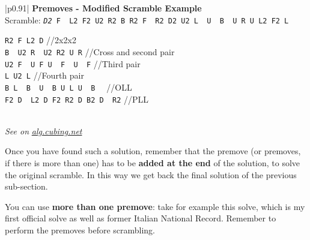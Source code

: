 \documentclass[11pt,a4paper]{book}
\newcommand{\p}{\textquotesingle}
\newcommand{\m}{\texttt}
\newcommand{\ps}{\p\,\,}
\newcommand{\comment}[1]{{\color{gray}\quad//#1}}
\begin{document}
\bigskip
\begin{tabular}{|p{}|}
\hline
\textbf{Premoves - Modified Scramble Example}\\
\hline
Scramble: \m{\emph{D2} F\ps L2 F2 U2 R2 B R2 F\ps R2 D2 U2 L\ps U\ps B\ps U R U L2 F2 L\p}\\
\hline
\begin{minipage}[l]{0.650\textwidth}
\m{R2 F L2 D\p} \comment{2x2x2}\\
\m{B\ps U2 R\ps U2 R2 U R} \comment{Cross and second pair}\\
\m{U2 F\ps U F U\ps F\ps U\ps F} \comment{Third pair}\\
\m{L U2 L\p} \comment{Fourth pair}\\
\m{B L\ps B\ps U\ps B U L U\ps B\ps} \comment{OLL}\\
\m{F2 D\ps L2 D F2 R2 D B2 D\ps R2} \comment{PLL}
\end{minipage}
\begin{minipage}[c]{0.25\textwidth}

\end{minipage}\\
\hline
\emph{See on }\href{https://alg.cubing.net/?setup=D2_F-_L2_F2_U2_R2_B_R2_F-_R2_D2_U2_L-_U-_B-_U_R_U_L2_F2_L-&alg=R2_F_L2_D-_\%2F\%2F2x2x2\%0AB-_U2_R-_U2_R2_U_R_\%2F\%2FCross_and_second_pair\%0AU2_F-_U_F_U-_F-_U-_F_\%2F\%2FThird_pair\%0AL_U2_L-_\%2F\%2FFourth_pair\%0AB_L-_B-_U-_B_U_L_U-_B-_\%2F\%2FOLL\%0AF2_D-_L2_D_F2_R2_D_B2_D-_R2_\%2F\%2FPLL}{\emph{alg.cubing.net}}\\
\hline
\end{tabular}
\bigskip

Once you have found such a solution, remember that the premove (or premoves, if there is more than one) has to be \textbf{added at the end} of the solution, to solve the original scramble. In this way we get back the final solution of the previous sub-section.

You can use \textbf{more than one premove}: take for example this solve, which is my first official solve as well as former Italian National Record. Remember to perform the premoves before scrambling.
\end{document}
